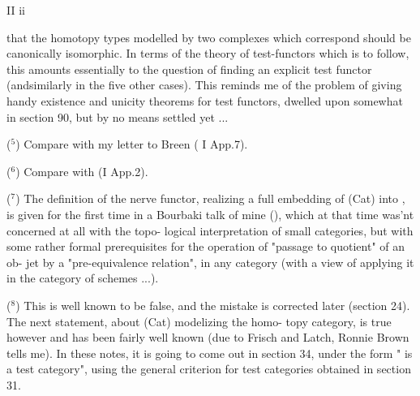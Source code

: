 II ii

that the homotopy types modelled by two complexes which correspond should
be canonically isomorphic. In terms of the theory of test-functors which
is to follow,  this amounts essentially to the question of finding an
explicit test functor  (and\hand{/}similarly in the five other cases).
This reminds me of the problem of giving handy existence and unicity
theorems for test functors, dwelled upon somewhat in section 90, but by
no means settled yet ...

($^5$)   Compare with my letter to Breen ( I App.7).

($^6$)   Compare with (I App.2).

($^7$)   The definition of the nerve functor,  realizing a full embedding
of (Cat) into \hand{\ensuremath{\Delta}}\hand{\ensuremath{^{\wedge}}}, is given for the first time  in a Bourbaki talk of mine
 (\hspace{5em}),  which at that time was'nt concerned at all with the topo-%
logical interpretation of small categories,  but with  some rather
formal prerequisites for the operation of "passage to quotient" of an ob-%
jet by a "pre-equivalence relation",  in any category (with a view of
applying it  in the category of schemes ...).

(\hand{\unsure{!}}$^8$)   This is well known to be false,  and the mistake is corrected
later (section 24).  The next statement,  about (Cat) modelizing the homo-%
topy category,  is true however and has been fairly well known  (due to
Frisch and Latch, Ronnie Brown tells me).  In these notes,  it is going
to come out in section 34,  under the form "\hand{\ensuremath{\Delta}} is a test category",
using the general criterion for test categories obtained in section 31.

